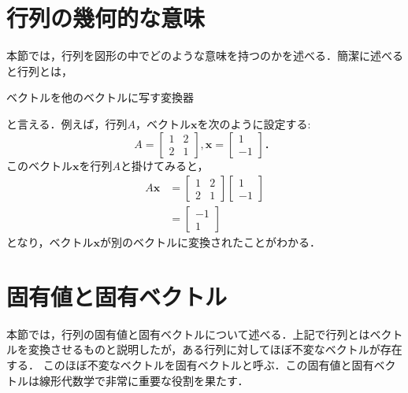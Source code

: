 \documentclass[a4paper,12pt,autodetect-engine,dvipdfmx]{jsarticle}
\theoremstyle{definition}
\begin{document}
\section{行列の幾何的な意味}
本節では，行列を図形の中でどのような意味を持つのかを述べる．簡潔に述べると行列とは，
\begin{center}
ベクトルを他のベクトルに写す変換器
\end{center}
と言える．例えば，行列$A$，ベクトル$\bm{x}$を次のように設定する:
\begin{equation*}
    A=
    \begin{bmatrix}
        1 & 2\\
        2 & 1
    \end{bmatrix},
    \bm{x} =
    \begin{bmatrix}
        1\\
        -1
    \end{bmatrix}．
\end{equation*}
このベクトル$\bm{x}$を行列$A$と掛けてみると，
\begin{align*}
    A \bm{x} &=
    \begin{bmatrix}
        1 & 2\\
        2 & 1
    \end{bmatrix}
    \begin{bmatrix}
        1\\
        -1
    \end{bmatrix}\\
    &=
    \begin{bmatrix}
        -1\\
        1
    \end{bmatrix}
\end{align*}
となり，ベクトル$\bm{x}$が別のベクトルに変換されたことがわかる．
\section{固有値と固有ベクトル}
本節では，行列の固有値と固有ベクトルについて述べる．上記で行列とはベクトルを変換させるものと説明したが，ある行列に対してほぼ不変なベクトルが存在する．
このほぼ不変なベクトルを固有ベクトルと呼ぶ．この固有値と固有ベクトルは線形代数学で非常に重要な役割を果たす．
\end{document}
